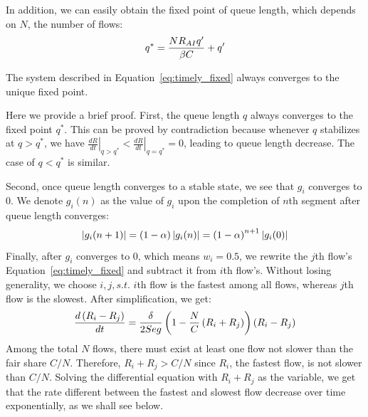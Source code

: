 In addition, we can easily obtain the fixed point of queue length, which depends on $N$, the number of flows:
\begin{equation}
\small
{q^*} = \frac{{N{R_{AI}}q'}}{{\beta C}} + q'
\label{eq:timely_fixed_q}
\end{equation}
\begin{thm}
The system described in Equation~\ref{eq:timely_fixed} always converges to the unique fixed point.
\end{thm}
Here we provide a brief proof. First, the queue length $q$ always
converges to the fixed point $q^*$. This can be proved by contradiction because whenever $q$ stabilizes
at $q>q^*$, we have ${\left. {\frac{{dR}}{{dt}}} \right|_{q > {q^*}}} < {\left. {\frac{{dR}}{{dt}}} \right|_{q = {q^*}}} = 0$, 
leading to queue length decrease. The case of $q<q^*$ is similar. 

Second, once queue length converges to a stable state, we see that $g_i$ converges to 0.
We denote ${g_i}(n)$ as the value of $g_i$ upon the completion of $n$th segment after queue
length converges:
\begin{equation}
\small
\left| {{g_i}(n + 1)} \right| = \left( {1 - \alpha} \right)\left| {{g_i}(n)} \right| = {\left( {1 - \alpha} \right)}^{n+1} \left| {{g_i}(0)} \right|
\end{equation}
Finally, after $g_i$ converges to 0, which means $w_i=0.5$, we rewrite the $j$th flow's Equation~\ref{eq:timely_fixed} 
and subtract it from $i$th flow's. Without losing generality, we choose $i,j, s.t.$ $i$th flow is the fastest among all flows,
whereas $j$th flow is the slowest. After simplification, we get:
\begin{equation}
\small
\frac{{d\left( {{R_i} - {R_j}} \right)}}{{dt}} = \frac{\delta }{{2Seg}}\left( {1 - \frac{N}{C}\left( {{R_i} + {R_j}} \right)} \right)\left( {{R_i} - {R_j}} \right)
\end{equation}
Among the total $N$ flows, there must exist at least one flow not slower than the fair share $C/N$.
Therefore, ${{R_i} + {R_j}} > C/N$ since $R_i$, the fastest flow, is not slower than $C/N$.
Solving the differential equation with ${{R_i} + {R_j}}$ as the variable, we get that the rate 
different between the fastest and slowest flow decrease over time exponentially, as we shall see below. 

